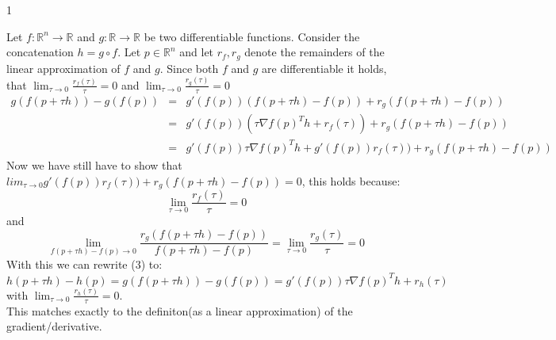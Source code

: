 \documentclass{article}
\begin{document}
\begin{ukon-infie}[12.11.17]{1}
		\begin{exercise}[p=10]{}
		Let $f: \mathbb{R}^n \rightarrow \mathbb{R}$ and $g: \mathbb{R} \rightarrow \mathbb{R}$ be two differentiable functions. Consider the concatenation $h = g \circ f$. Let $p \in \mathbb{R}^n$ and let $r_f , r_g$ denote the remainders of the linear approximation of $f$ and $g$. Since both $f$ and $g$ are differentiable it holds, that $\lim_{\tau \to 0}\frac{r_f(\tau)}{\tau} = 0$ and $\lim_{\tau \to 0}\frac{r_g(\tau)}{\tau} = 0$ \\
		\begin{eqnarray}
		g(f(p + \tau h)) - g(f(p)) & = & g'(f(p))(f(p + \tau h) - f(p)) + r_g(f(p + \tau h) - f(p)) \\
												& = & g'(f(p))(\tau \nabla f(p)^T h + r_f(\tau)) + r_g(f(p + \tau h) - f(p)) \\
											  & = & g'(f(p))\tau \nabla f(p)^T h + g'(f(p)) r_f(\tau)) + r_g(f(p + \tau h) - f(p))
		\end{eqnarray}
		Now we have still have to show that $lim_{\tau \to 0}g'(f(p)) r_f(\tau)) + r_g(f(p + \tau h) - f(p)) = 0$, this holds because:\\
		$$\lim_{\tau \to 0}\frac{r_f(\tau)}{\tau} = 0$$ and $$\lim_{f(p + \tau h) - f(p) \to 0}\frac{r_g(f(p + \tau h) - f(p))}{f(p + \tau h) - f(p)} = \lim_{\tau \to 0}\frac{r_g(\tau)}{\tau} = 0$$With this we can rewrite (3) to: \\
		
		$$h (p + \tau h) - h(p) = g(f(p + \tau h)) - g(f(p)) = g'(f(p))\tau \nabla f(p)^T h + r_h(\tau)$$ with $\lim_{\tau \to 0}\frac{r_h(\tau)}{\tau} = 0$. \\This matches exactly to the definiton(as a linear approximation) of the gradient/derivative.
        	
		\end{exercise}
		
		
\end{ukon-infie}
\end{document}
